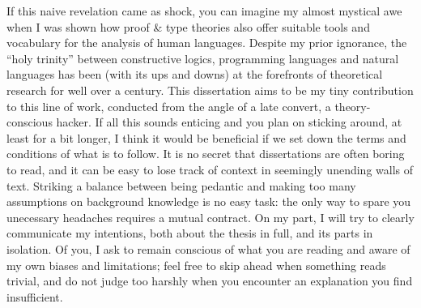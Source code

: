 If this naive revelation came as shock, you can imagine my almost mystical awe when I was shown how proof \& type theories also offer suitable tools and vocabulary for the analysis of human languages. 
Despite my prior ignorance, the “holy trinity” between constructive logics, programming languages and natural languages has been (with its ups and downs) at the forefronts of theoretical research for well over a century. 
This dissertation aims to be my tiny contribution to this line of work, conducted from the angle of a late convert, a theory-conscious hacker. 
If all this sounds enticing and you plan on sticking around, at least for a bit longer, I think it would be beneficial if we set down the terms and conditions of what is to follow. 
It is no secret that dissertations are often boring to read, and it can be easy to lose track of context in seemingly unending walls of text. 
Striking a balance between being pedantic and making too many assumptions on background knowledge is no easy task: the only way to spare you unecessary headaches requires a mutual contract. 
On my part, I will try to clearly communicate my intentions, both about the thesis in full, and its parts in isolation. 
Of you, I ask to remain conscious of what you are reading and aware of my own biases and limitations; feel free to skip ahead when something reads trivial, and do not judge too harshly when you encounter an explanation you find insufficient.

%
